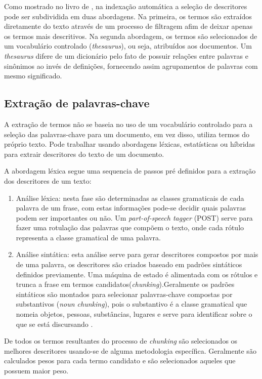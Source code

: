 Como mostrado no livro de \cite{Moens2000}, na indexação automática a seleção de descritores pode ser subdividida em duas abordagens. Na primeira, os termos são extraídos diretamente do texto através de um processo de filtragem afim de deixar apenas os termos mais descritivos. Na segunda abordagem, os termos são selecionados de um vocabulário controlado (\emph{thesaurus}), ou seja, atribuídos aos documentos. Um \emph{thesaurus} difere de um dicionário pelo fato de possuir relações entre palavras e sinônimos ao invés de definições, fornecendo assim agrupamentos de palavras com mesmo significado.
 
\subsection{Extração de palavras-chave}
A extração de termos não se baseia no uso de um vocabulário controlado para a seleção das palavras-chave para um documento, em vez disso, utiliza termos do próprio texto. Pode trabalhar usando abordagens léxicas, estatísticas ou híbridas para extrair descritores do texto de um documento.

A abordagem léxica segue uma sequencia de passos pré definidos para a extração dos descritores de um texto:
\begin{enumerate}
    \item Análise léxica: nesta fase são determinadas as classes gramaticais de cada palavra de um frase, com estas informações pode-se decidir quais palavras podem ser importantes ou não. Um \emph{part-of-speech tagger} (POST) serve para fazer uma rotulação das palavras que compõem o texto, onde cada rótulo representa a classe gramatical de uma palavra.
    \item Análise sintática: esta análise serve para gerar descritores compostos por mais de uma palavra, os descritores são criados baseado em padrões sintáticos definidos previamente. Uma máquina de estado é alimentada com os rótulos e trunca a frase em termos candidatos(\emph{chunking}).Geralmente os padrões sintáticos são montados para selecionar palavras-chave compostas por substantivos (\emph{noun chunking}), pois o substantivo é a classe gramatical que nomeia objetos, pessoas, substâncias, lugares e serve para identificar sobre o que se está discursando \cite{Gucker1966}.
\end{enumerate}
De todos os termos resultantes do processo de \emph{chunking} são selecionados os melhores descritores usando-se de alguma metodologia específica. Geralmente são calculados pesos para cada termo candidato e são selecionados aqueles que possuem maior peso.

